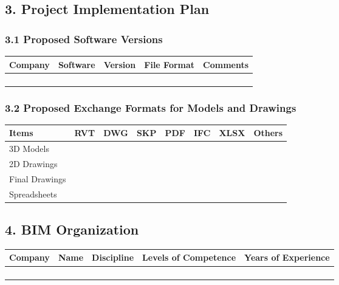 \documentclass[
]{book}
\begin{document}
\hypertarget{project-implementation-plan}{%
\subsection{3. Project Implementation Plan}\label{project-implementation-plan}}

\hypertarget{proposed-software-versions}{%
\subsubsection{3.1 Proposed Software Versions}\label{proposed-software-versions}}

\begin{longtable}[]{@{}lllll@{}}
\toprule()
Company & Software & Version & File Format & Comments \\
\midrule()
\endhead
& & & & \\
& & & & \\
& & & & \\
& & & & \\
\bottomrule()
\end{longtable}

\hypertarget{proposed-exchange-formats-for-models-and-drawings}{%
\subsubsection{3.2 Proposed Exchange Formats for Models and Drawings}\label{proposed-exchange-formats-for-models-and-drawings}}

\begin{longtable}[]{@{}llllllll@{}}
\toprule()
Items & RVT & DWG & SKP & PDF & IFC & XLSX & Others \\
\midrule()
\endhead
3D Models & & & & & & & \\
2D Drawings & & & & & & & \\
Final Drawings & & & & & & & \\
Spreadsheets & & & & & & & \\
\bottomrule()
\end{longtable}

\hypertarget{bim-organization}{%
\subsection{4. BIM Organization}\label{bim-organization}}

\begin{longtable}[]{@{}lllll@{}}
\toprule()
Company & Name & Discipline & Levels of Competence & Years of Experience \\
\midrule()
\endhead
& & & & \\
& & & & \\
& & & & \\
& & & & \\
\bottomrule()
\end{longtable}
\end{document}
